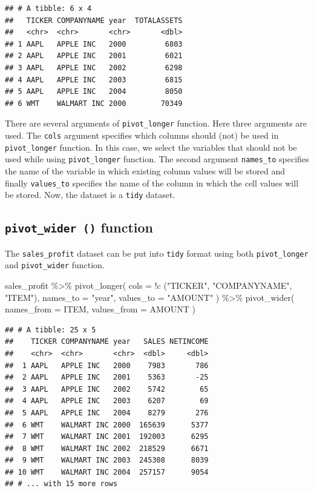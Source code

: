 \documentclass[
]{book}
\newenvironment{Shaded}{\begin{snugshade}}{\end{snugshade}}
\newcommand{\AttributeTok}[1]{\textcolor[rgb]{0.77,0.63,0.00}{#1}}
\newcommand{\FunctionTok}[1]{\textcolor[rgb]{0.00,0.00,0.00}{#1}}
\newcommand{\NormalTok}[1]{#1}
\newcommand{\SpecialCharTok}[1]{\textcolor[rgb]{0.00,0.00,0.00}{#1}}
\newcommand{\StringTok}[1]{\textcolor[rgb]{0.31,0.60,0.02}{#1}}
\begin{document}
\begin{verbatim}
## # A tibble: 6 x 4
##   TICKER COMPANYNAME year  TOTALASSETS
##   <chr>  <chr>       <chr>       <dbl>
## 1 AAPL   APPLE INC   2000         6803
## 2 AAPL   APPLE INC   2001         6021
## 3 AAPL   APPLE INC   2002         6298
## 4 AAPL   APPLE INC   2003         6815
## 5 AAPL   APPLE INC   2004         8050
## 6 WMT    WALMART INC 2000        70349
\end{verbatim}

There are several arguments of \texttt{pivot\_longer} function. Here three arguments are used. The \texttt{cols} argument specifies which columns should (not) be used in \texttt{pivot\_longer} function. In this case, we select the variables that should not be used while using \texttt{pivot\_longer} function. The second argument \texttt{names\_to} specifies the name of the variable in which existing column values will be stored and finally \texttt{values\_to} specifies the name of the column in which the cell values will be stored. Now, the dataset is a \texttt{tidy} dataset.

\hypertarget{pivot_wider-function}{%
\subsection{\texorpdfstring{\texttt{pivot\_wider\ ()} function}{pivot\_wider () function}}\label{pivot_wider-function}}

The \texttt{sales\_profit} dataset can be put into \texttt{tidy} format using both \texttt{pivot\_longer} and \texttt{pivot\_wider} function.

\begin{Shaded}
\begin{Highlighting}[]
\NormalTok{sales\_profit }\SpecialCharTok{\%\textgreater{}\%} 
  \FunctionTok{pivot\_longer}\NormalTok{(}
    \AttributeTok{cols =} \SpecialCharTok{!}\FunctionTok{c}\NormalTok{ (}\StringTok{"TICKER"}\NormalTok{, }\StringTok{"COMPANYNAME"}\NormalTok{, }\StringTok{"ITEM"}\NormalTok{),}
    \AttributeTok{names\_to =} \StringTok{"year"}\NormalTok{,}
    \AttributeTok{values\_to =} \StringTok{"AMOUNT"}
\NormalTok{  ) }\SpecialCharTok{\%\textgreater{}\%} 
  \FunctionTok{pivot\_wider}\NormalTok{(}
    \AttributeTok{names\_from =}\NormalTok{ ITEM, }
    \AttributeTok{values\_from =}\NormalTok{ AMOUNT}
\NormalTok{  )}
\end{Highlighting}
\end{Shaded}

\begin{verbatim}
## # A tibble: 25 x 5
##    TICKER COMPANYNAME year   SALES NETINCOME
##    <chr>  <chr>       <chr>  <dbl>     <dbl>
##  1 AAPL   APPLE INC   2000    7983       786
##  2 AAPL   APPLE INC   2001    5363       -25
##  3 AAPL   APPLE INC   2002    5742        65
##  4 AAPL   APPLE INC   2003    6207        69
##  5 AAPL   APPLE INC   2004    8279       276
##  6 WMT    WALMART INC 2000  165639      5377
##  7 WMT    WALMART INC 2001  192003      6295
##  8 WMT    WALMART INC 2002  218529      6671
##  9 WMT    WALMART INC 2003  245308      8039
## 10 WMT    WALMART INC 2004  257157      9054
## # ... with 15 more rows
\end{verbatim}
\end{document}
